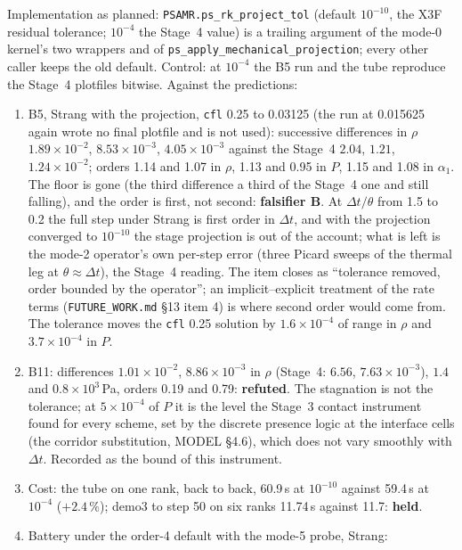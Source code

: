 \documentclass[11pt,a4paper]{article}
\newcommand{\code}[1]{\texttt{\small #1}}
\newcommand{\Dt}{\Delta t}
\begin{document}
Implementation as planned: \code{PSAMR.ps\_rk\_project\_tol} (default
$10^{-10}$, the X3F residual tolerance; $10^{-4}$ the Stage~4 value) is
a trailing argument of the mode-0 kernel's two wrappers and of
\code{ps\_apply\_mechanical\_projection}; every other caller keeps the
old default.  Control: at $10^{-4}$ the B5 run and the tube reproduce
the Stage~4 plotfiles bitwise.  Against the predictions:
\begin{enumerate}[nosep]
\item B5, Strang with the projection, \code{cfl} 0.25 to 0.03125 (the
      run at 0.015625 again wrote no final plotfile and is not used):
      successive differences in $\rho$ $1.89\times10^{-2}$,
      $8.53\times10^{-3}$, $4.05\times10^{-3}$ against the Stage~4
      $2.04$, $1.21$, $1.24\times10^{-2}$; orders 1.14 and 1.07 in
      $\rho$, 1.13 and 0.95 in $P$, 1.15 and 1.08 in $\alpha_1$.  The
      floor is gone (the third difference a third of the Stage~4 one and
      still falling), and the order is first, not second: \textbf{falsifier
      B}.  At $\Dt/\theta$ from 1.5 to 0.2 the full step under Strang
      is first order in $\Dt$, and with the projection converged to
      $10^{-10}$ the stage projection is out of the account; what is
      left is the mode-2 operator's own per-step error (three Picard
      sweeps of the thermal leg at $\theta\approx\Dt$), the Stage~4
      reading.  The item closes as ``tolerance removed, order bounded by
      the operator''; an implicit--explicit treatment of the rate terms
      (\code{FUTURE\_WORK.md} \S13 item 4) is where second order would
      come from.  The tolerance moves the \code{cfl} 0.25 solution by
      $1.6\times10^{-4}$ of range in $\rho$ and $3.7\times10^{-4}$ in
      $P$.
\item B11: differences $1.01\times10^{-2}$, $8.86\times10^{-3}$ in
      $\rho$ (Stage~4: $6.56$, $7.63\times10^{-3}$), $1.4$ and
      $0.8\times10^{3}$\,Pa, orders 0.19 and 0.79: \textbf{refuted}.
      The stagnation is not the tolerance; at $5\times10^{-4}$ of $P$ it
      is the level the Stage~3 contact instrument found for every scheme,
      set by the discrete presence logic at the interface cells (the
      corridor substitution, MODEL \S4.6), which does not vary smoothly
      with $\Dt$.  Recorded as the bound of this instrument.
\item Cost: the tube on one rank, back to back, 60.9\,s at $10^{-10}$
      against 59.4\,s at $10^{-4}$ ($+2.4\,\%$); demo3 to step 50 on
      six ranks 11.74\,s against 11.7: \textbf{held}.
\item Battery under the order-4 default with the mode-5 probe, Strang:

\end{enumerate}
\end{document}
